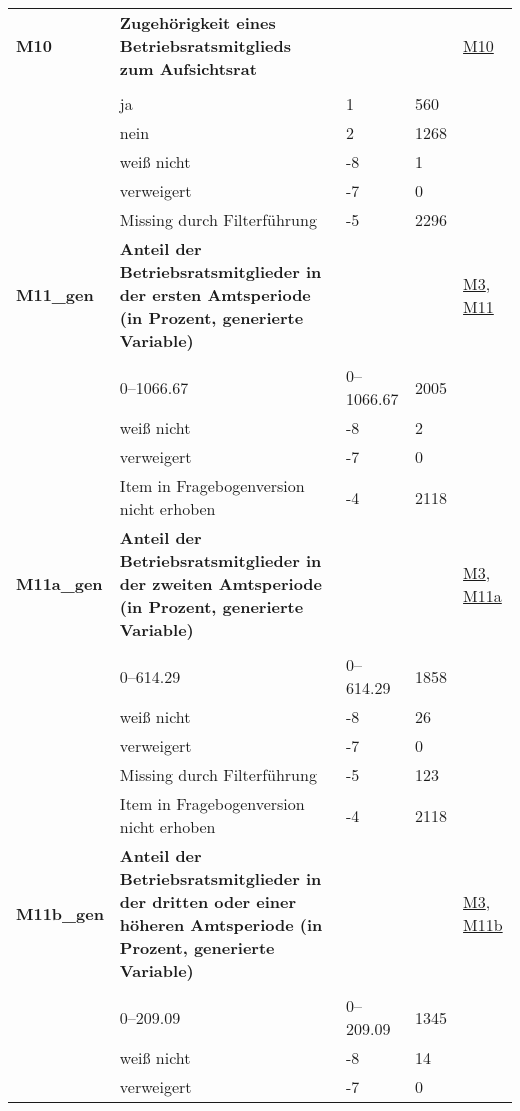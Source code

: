 \begin{longtable}{| L{2.5cm} | L{8.25cm}| C{1.5cm} | R{1.25cm} | C{2.25cm} |  }
   \midrule
\textbf{M10}\label{var:suf:M10} & \textbf{Zugehörigkeit eines Betriebsratsmitglieds zum Aufsichtsrat} &  &  & \hyperref[M10]{M10} \\ 
   &  &  &  &  \\ 
   & ja & 1 & 560 &  \\ 
   & nein & 2 & 1268 &  \\ 
   & weiß nicht & -8 & 1 &  \\ 
   & verweigert & -7 & 0 &  \\ 
   & Missing durch Filterführung & -5 & 2296 &  \\ 
   \midrule
\textbf{M11\_gen}\label{var:suf:M11:gen} & \textbf{Anteil der Betriebsratsmitglieder in der ersten Amtsperiode (in Prozent, generierte Variable)} &  &  & \hyperref[M3]{M3}, \hyperref[M11]{M11} \\ 
   &  &  &  &  \\ 
   & 0--1066.67 & 0--1066.67 & 2005 &  \\ 
   & weiß nicht & -8 & 2 &  \\ 
   & verweigert & -7 & 0 &  \\ 
   & Item in Fragebogenversion nicht erhoben & -4 & 2118 &  \\ 
   \midrule
\textbf{M11a\_gen}\label{var:suf:M11a:gen} & \textbf{Anteil der Betriebsratsmitglieder in der zweiten Amtsperiode (in Prozent, generierte Variable)} &  &  & \hyperref[M3]{M3}, \hyperref[M11a]{M11a} \\ 
   &  &  &  &  \\ 
   & 0--614.29 & 0--614.29 & 1858 &  \\ 
   & weiß nicht & -8 & 26 &  \\ 
   & verweigert & -7 & 0 &  \\ 
   & Missing durch Filterführung & -5 & 123 &  \\ 
   & Item in Fragebogenversion nicht erhoben & -4 & 2118 &  \\ 
   \midrule
\textbf{M11b\_gen}\label{var:suf:M11b:gen} & \textbf{Anteil der Betriebsratsmitglieder in der dritten oder einer höheren Amtsperiode (in Prozent, generierte Variable)} &  &  & \hyperref[M3]{M3}, \hyperref[M11b]{M11b} \\ 
   &  &  &  &  \\ 
   & 0--209.09 & 0--209.09 & 1345 &  \\ 
   & weiß nicht & -8 & 14 &  \\ 
   & verweigert & -7 & 0 &  \\ 

\end{longtable}
